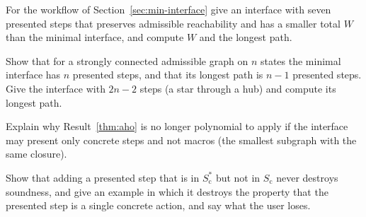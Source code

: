 \begin{exercise}
For the workflow of Section~\ref{sec:min-interface} give an interface with seven presented steps that preserves admissible reachability and has a smaller total $W$ than the minimal interface, and compute $W$ and the longest path.
\end{exercise}

\begin{exercise}
Show that for a strongly connected admissible graph on $n$ states the minimal interface has $n$ presented steps, and that its longest path is $n-1$ presented steps. Give the interface with $2n-2$ steps (a star through a hub) and compute its longest path.\label{ex2:hub}
\end{exercise}

\begin{exercise}
Explain why Result~\ref{thm:aho} is no longer polynomial to apply if the interface may present only concrete steps and not macros (the smallest subgraph with the same closure).
\end{exercise}

\begin{exercise}
Show that adding a presented step that is in $S_{\mathrm c}^{*}$ but not in $S_{\mathrm c}$ never destroys soundness, and give an example in which it destroys the property that the presented step is a single concrete action, and say what the user loses.
\end{exercise}

